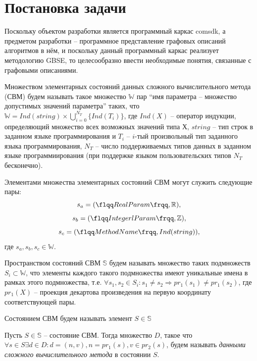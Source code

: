 \chapter{Постановка задачи}\label{chap1_taskStatement}
Поскольку объектом разработки является программный каркас comsdk, а предметом разработки -- программное представление графовых описаний алгоритмов в нём, и поскольку данный программный каркас реализует методологию GBSE, то целесообразно ввести необходимые понятия, связанные с графовыми описаниями.

\begin{definition}
    Множеством элементарных состояний данных сложного вычислительного метода (СВМ) будем называть такое множество \(\mathbb{W}\) пар ``имя параметра -- множество допустимых значений параметра'' таких, что \(\mathbb{W}=Ind(string)\times\bigcup_{i=0}^{N_T}\{Ind(T_i)\}\), где \(Ind(X)\) -- оператор индукции, определяющий множество всех возможных значений типа Х, \(string\) -- тип строк в заданном языке программирования и \(T_i\) -- \(i\)-тый произвольный тип заданного языка программирования, \(N_T\) -- число поддерживаемых типов данных в заданном языке программиирования (при поддержке языком пользовательских типов \(N_T\) бесконечно).
\end{definition}

Элементами множества элементарных состояний СВМ могут служить следующие пары:
$$s_a=(\flqq RealParam \frqq, \mathbb{R}),$$
$$s_b=(\flqq IntegerlParam \frqq, \mathbb{Z}),$$
$$s_c=(\flqq MethodName \frqq, Ind(string)),$$
где \(s_a, s_b, s_c \in \mathbb{W}\).

\begin{definition}
    Пространством состояний СВМ \(\mathbb{S}\) будем называть множество таких подмножеств \(S_i\subset\mathbb{W}\), что элементы каждого такого подмножества имеют уникальные имена в рамках этого подмножества, т.е. \(\forall s_1, s_2 \in S_i: s_1 \neq s_2 \Rightarrow pr_1(s_1) \neq pr_1(s_2)\), где \(pr_1(X)\) -- проекция декартова произведения на первую координату соответствующей пары.
\end{definition}

\begin{definition}
    Состоянием СВМ будем называть элемент \(S\in\mathbb{S}\)
\end{definition}

\begin{definition}
    \label{def:CCMData}
    Пусть \(S\in\mathbb{S}\) -- состояние СВМ. Тогда множество \(D\), такое что \(\forall s \in S \exists d \in D : d = (n,v), n = pr_1(s), v \in pr_2(s)\),
    будем называть \emph{данными сложного вычислительного метода} в состоянии $S$.
\end{definition}

